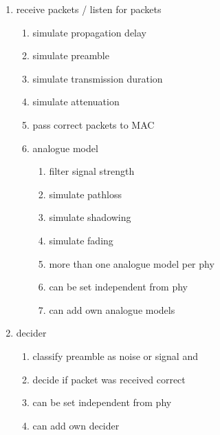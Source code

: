 \begin{enumerate}
\begin{enumerate}
	\end{enumerate}
 \item receive packets / listen for packets
		\begin{enumerate}
		\item simulate propagation delay \label{rcvSimDelay}
		\item simulate preamble \label{rcvSimPreamble}
		\item simulate transmission duration \label{rcvSimDuration}
		\item simulate attenuation \label{rcvSimAttenuation}
		\item pass correct packets to MAC \label{rcvPassToMAC}
		\item analogue model
			\begin{enumerate}
			\item filter signal strength \label{analogueFilter}
			\item simulate pathloss \label{analogueSimPathloss}
			\item simulate shadowing \label{analogueSimShadowing}
			\item simulate fading \label{analogueSimFading}
			\item more than one analogue model per phy \label{analogueMulti}
			\item can be set independent from phy \label{analogueIndependent}
			\item can add own analogue models \label{analogueExtensible}
			\end{enumerate}
		\end{enumerate}
		\item decider
			\begin{enumerate}
			\item classify preamble as noise or signal  and \label{rcvClassify}
			\item decide if packet was received correct \label{rcvIsCorrect}
			\item can be set independent from phy \label{deciderIndependent}
			\item can add own decider \label{deciderExtensible}

\end{enumerate}
\end{enumerate}
